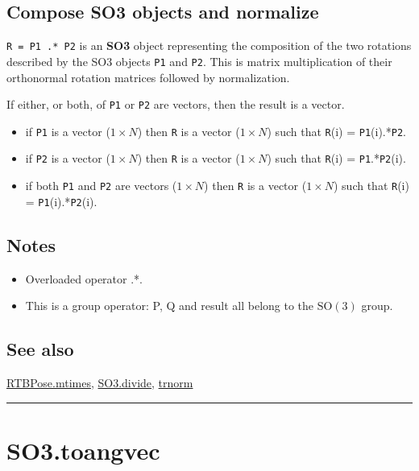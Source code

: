 \subsection*{Compose SO3 objects and normalize}


\texttt{R = P1 .* P2} is an \textbf{\color{red} SO3} object representing the composition of the two
rotations described by the SO3 objects \texttt{P1} and \texttt{P2}. This is matrix multiplication
of their orthonormal rotation matrices followed by normalization.



If either, or both, of \texttt{P1} or \texttt{P2} are vectors, then the result is a vector.

\begin{itemize}
  \item if \texttt{P1} is a vector ($1 \times N$) then \texttt{R} is a vector ($1 \times N$) such that \texttt{R}(i) = \texttt{P1}(i).*\texttt{P2}.
  \item if \texttt{P2} is a vector ($1 \times N$) then \texttt{R} is a vector ($1 \times N$) such that \texttt{R}(i) = \texttt{P1}.*\texttt{P2}(i).
  \item if both \texttt{P1} and \texttt{P2} are vectors ($1 \times N$) then \texttt{R} is a vector ($1 \times N$) such     that \texttt{R}(i) = \texttt{P1}(i).*\texttt{P2}(i).
\end{itemize}

\subsection*{Notes}
\begin{itemize}
  \item Overloaded operator \textquotesingle .*\textquotesingle .
  \item This is a group operator: P, Q and result all belong to the $\mbox{SO}(3)$ group.
\end{itemize}

\subsection*{See also}


\hyperlink{RTBPose.mtimes}{\color{blue} RTBPose.mtimes}, \hyperlink{SO3.divide}{\color{blue} SO3.divide}, \hyperlink{trnorm}{\color{blue} trnorm}

\vspace{1.5ex}\hrule

\hypertarget{SO3.toangvec}{\section*{SO3.toangvec}}
